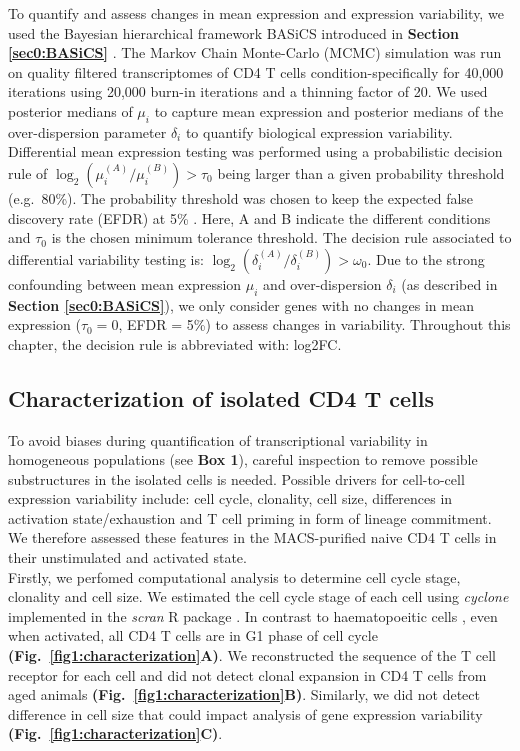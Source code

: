 To quantify and assess changes in mean expression and expression variability, we used the Bayesian hierarchical framework BASiCS introduced in \textbf{Section \ref{sec0:BASiCS}} \citep{Vallejos2015BASiCS, Vallejos2016}. The Markov Chain Monte-Carlo (MCMC) simulation was run on quality filtered transcriptomes of CD4\plus{} T cells condition-specifically for 40,000 iterations using 20,000 burn-in iterations and a thinning factor of 20. We used posterior medians of $\mu_i$ to capture mean expression and posterior medians of the over-dispersion parameter $\delta_i$ to quantify biological expression variability. Differential mean expression testing was performed using a probabilistic decision rule of $\log_2(\mu_i^{(A)}/\mu_i^{(B)})>\tau_0$ being larger than a given probability threshold (e.g.~80\%). The probability threshold was chosen to keep the expected false discovery rate (EFDR) at 5\% \citep{Vallejos2016}. Here, A and B indicate the different conditions and $\tau_0$ is the chosen minimum tolerance threshold. The decision rule associated to differential variability testing is: $\log_2(\delta_i^{(A)}/\delta_i^{(B)})>\omega_0$. Due to the strong confounding between mean expression $\mu_i$ and over-dispersion $\delta_i$ (as described in \textbf{Section \ref{sec0:BASiCS}}), we only consider genes with no changes in mean expression ($\tau_0=0$, EFDR = 5\%) to assess changes in variability. Throughout this chapter, the decision rule is abbreviated with: log2FC. 

\newpage

\subsection{Characterization of isolated CD4\plus{} T cells}
\label{sec1:characterization}

To avoid biases during quantification of transcriptional variability in homogeneous populations (see \textbf{Box 1}), careful inspection to remove possible substructures in the isolated cells is needed. Possible drivers for cell-to-cell expression variability include: cell cycle, clonality, cell size, differences in activation state/exhaustion and T cell priming in form of lineage commitment. We therefore assessed these features in the MACS-purified naive CD4\plus{} T cells in their unstimulated and activated state.\\

Firstly, we perfomed computational analysis to determine cell cycle stage, clonality and cell size. We estimated the cell cycle stage of each cell using \emph{cyclone} \citep{Scialdone2015} implemented in the \emph{scran} R package \citep{Lun2016}. In contrast to haematopoeitic cells \citep{Kowalczyk2015}, even when activated, all CD4\plus{} T cells are in G1 phase of cell cycle \textbf{(Fig.~\ref{fig1:characterization}A)}. We reconstructed the sequence of the T cell receptor for each cell \citep{Stubbington2015} and did not detect clonal expansion in CD4\plus{} T cells from aged animals \textbf{(Fig.~\ref{fig1:characterization}B)}. Similarly, we did not detect difference in cell size that could impact analysis of gene expression variability \textbf{(Fig.~\ref{fig1:characterization}C)}. \\

